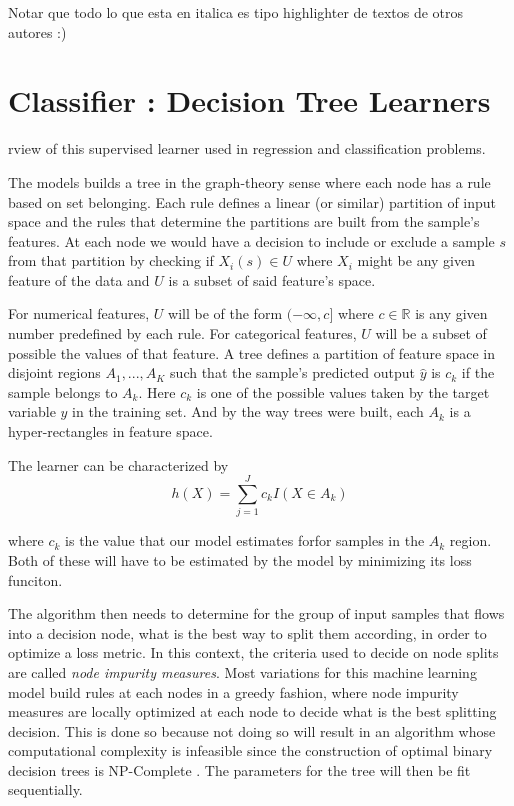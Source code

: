 Notar que todo lo que esta en italica es tipo highlighter de textos de otros autores :)

\section{Classifier : Decision Tree Learners}

rview of this supervised learner used in regression and classification problems.

The models builds a tree in the graph-theory sense where each node has a rule based on set belonging. Each rule defines a linear (or similar) partition of input space and the rules that determine the partitions are built from the sample's features. At each node we would have a decision to include or exclude a sample $s$ from that partition by checking if $X_i(s) \in U$ where $X_i$ might be any given feature of the data and $U$ is a subset of said feature's space.

For numerical features, $U$ will be of the form $(-\infty,c]$ where $c \in \mathbb{R}$ is any given number predefined by each rule. For categorical features, $U$ will be a subset of possible the values of that feature. A tree defines a partition of feature space in disjoint regions $A_1,...,A_K$ such that the sample's predicted output $\hat{y}$ is $c_k$ if the sample belongs to $A_k$. Here $c_k$ is one of the possible values taken by the target variable $y$ in the training set. And by the way trees were built, each $A_k$ is a hyper-rectangles in feature space.

The learner can be characterized by 
\[
h(X) = \sum_{j=1}^J c_k I(X \in A_k)
\]\label{equation-decisionTreeModel}

where $c_k$ is the value that our model estimates forfor samples in the $A_k$ region. Both of these will have to be estimated by the model by minimizing its loss funciton.

The algorithm then needs to determine for the group of input samples that flows into a decision node, what is the best way to split them according, in order to optimize a loss metric. In this context, the criteria used to decide on node splits are called \textit{node impurity measures}. Most variations for this machine learning model build rules at each nodes in a greedy fashion, where node impurity measures are locally optimized at each node to decide what is the best splitting decision. This is done so because not doing so will result in an algorithm whose computational complexity is infeasible since the construction of optimal binary decision trees is NP-Complete \cite{decisionTreesNP}. The parameters for the tree will then be fit sequentially.

